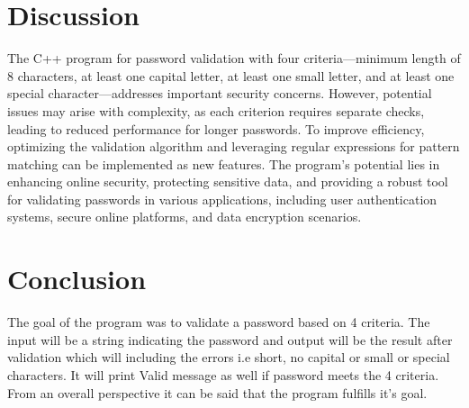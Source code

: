 \documentclass{report}
\newcounter{exp_no}
\begin{document}
\section*{Discussion}
The C++ program for password validation with four criteria—minimum length of 8 characters, at least one capital letter, at least one small letter, and at least one special character—addresses important security concerns. However, potential issues may arise with complexity, as each criterion requires separate checks, leading to reduced performance for longer passwords. To improve efficiency, optimizing the validation algorithm and leveraging regular expressions for pattern matching can be implemented as new features. The program's potential lies in enhancing online security, protecting sensitive data, and providing a robust tool for validating passwords in various applications, including user authentication systems, secure online platforms, and data encryption scenarios.

\section*{Conclusion}
The goal of the program was to validate a password based on 4 criteria. The input will be a string indicating the password and output will be the result after validation which will including the errors i.e short, no capital or small or special characters. It will print Valid message as well if password meets the 4 criteria. From an overall perspective it can be said that the program fulfills it's goal.
\end{document}
